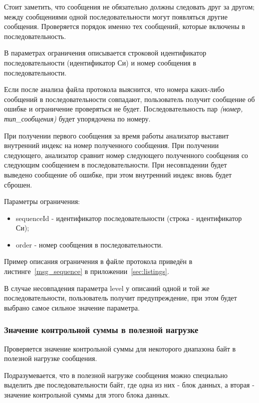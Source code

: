 Стоит заметить, что сообщения не обязательно должны следовать друг за другом; 
между сообщениями одной последовательности могут появляться другие сообщения. 
Проверяется порядок именно тех сообщений, которые включены в последовательность.

В параметрах ограничения описывается строковой идентификатор последовательности 
(идентификатор Си) и номер сообщения в последовательности. 

Если после анализа файла протокола выяснится, что номера каких-либо сообщений в 
последовательности совпадают, пользователь получит сообщение об ошибке и 
ограничение проверяться не будет. Последовательность пар \textit{(номер, 
тип\_сообщения)} будет упорядочена по номеру.

При получении первого сообщения за время работы анализатор выставит внутренний
индекс на номер полученного сообщения. При получении следующего, анализатор
сравнит номер следующего полученного сообщения со следующим сообщением в 
последовательности. При несовпадении будет выведено сообщение об ошибке,
при этом внутренний индекс вновь будет сброшен.

Параметры ограничения:

\begin{itemize}
 \item sequenceId - идентификатор последовательности (строка - идентификатор 
Си);
 \item order - номер сообщения в последовательности.
\end{itemize}

Пример описания ограничения в файле протокола приведён в 
листинге~\ref{msg_sequence} в приложении~\ref{sec:listings}.

В случае несовпадения параметра level у описаний одной и той же 
последовательности, пользователь получит предупреждение, при этом будет выбрано 
самое сильное значение параметра.

\subsubsection{Значение контрольной суммы в полезной нагрузке}

Проверяется значение контрольной суммы для некоторого диапазона байт в полезной 
нагрузке сообщения.

Подразумевается, что в полезной нагрузке сообщения можно специально выделить 
две последовательности байт, где одна из них - блок данных, а вторая - значение 
контрольной суммы для этого блока данных.


